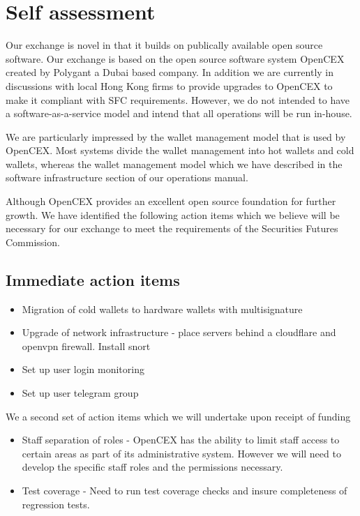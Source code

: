 \documentclass[]{report}
\begin{document}
\section{Self assessment}

Our exchange is novel in that it builds on publically available open
source software.  Our exchange is based on the open source software
system OpenCEX created by Polygant a Dubai based company.  In addition
we are currently in discussions with local Hong Kong firms to provide
upgrades to OpenCEX to make it compliant with SFC requirements.
However, we do not intended to have a software-as-a-service model and
intend that all operations will be run in-house.

We are particularly impressed by the wallet management model that is
used by OpenCEX.  Most systems divide the wallet management into hot
wallets and cold wallets, whereas the wallet management model which we
have described in the software infrastructure section of our
operations manual.

Although OpenCEX provides an excellent open source foundation for
further growth.  We have identified the following action items which
we believe will be necessary for our exchange to meet the requirements
of the Securities Futures Commission.

\subsection{Immediate action items}

\begin{itemize}
\item Migration of cold wallets to hardware wallets with multisignature

\item Upgrade of network infrastructure - place servers behind a cloudflare and
openvpn firewall.  Install snort

\item Set up user login monitoring

\item Set up user telegram group
\end{itemize}

We a second set of action items which we will undertake upon receipt
of funding

\begin{itemize}

\item Staff separation of roles - OpenCEX has the ability to limit
  staff access to certain areas as part of its administrative system.
  However we will need to develop the specific staff roles and the
  permissions necessary.

\item Test coverage - Need to run test coverage checks and insure
  completeness of regression tests.

\end{itemize}
\end{document}
